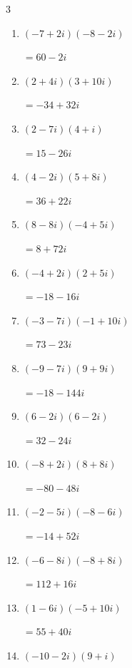 \begin{multicols}{3}
\begin{enumerate}
  \item $\displaystyle (-7+2i)(-8-2i)$

        $\displaystyle =60-2i$

  \item $\displaystyle (2+4i)(3+10i)$

        $\displaystyle =-34+32i$

  \item $\displaystyle (2-7i)(4+i)$

        $\displaystyle =15-26i$

  \item $\displaystyle (4-2i)(5+8i)$

        $\displaystyle =36+22i$

  \item $\displaystyle (8-8i)(-4+5i)$

        $\displaystyle =8+72i$

  \item $\displaystyle (-4+2i)(2+5i)$

        $\displaystyle =-18-16i$

  \item $\displaystyle (-3-7i)(-1+10i)$

        $\displaystyle =73-23i$

  \item $\displaystyle (-9-7i)(9+9i)$

        $\displaystyle =-18-144i$

  \item $\displaystyle (6-2i)(6-2i)$

        $\displaystyle =32-24i$

  \item $\displaystyle (-8+2i)(8+8i)$

        $\displaystyle =-80-48i$

  \item $\displaystyle (-2-5i)(-8-6i)$

        $\displaystyle =-14+52i$

  \item $\displaystyle (-6-8i)(-8+8i)$

        $\displaystyle =112+16i$

  \item $\displaystyle (1-6i)(-5+10i)$

        $\displaystyle =55+40i$

\columnbreak %

  \item $\displaystyle (-10-2i)(9+i)$


\end{enumerate}
\end{multicols}
